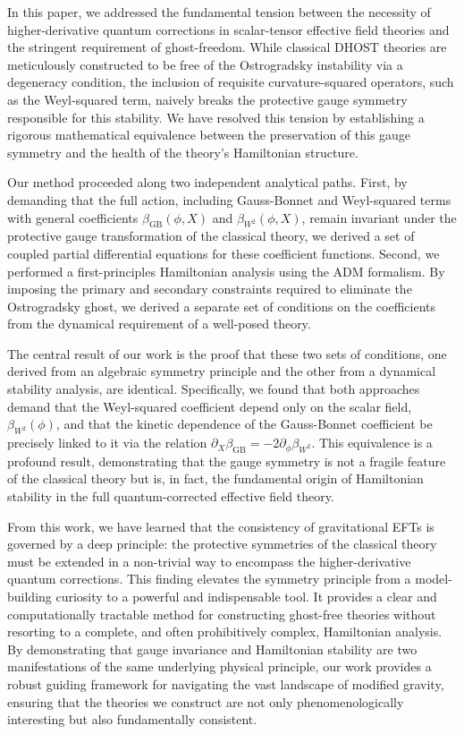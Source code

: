 \documentclass[twocolumn]{aastex631}
\begin{document}
In this paper, we addressed the fundamental tension between the necessity of higher-derivative quantum corrections in scalar-tensor effective field theories and the stringent requirement of ghost-freedom. While classical DHOST theories are meticulously constructed to be free of the Ostrogradsky instability via a degeneracy condition, the inclusion of requisite curvature-squared operators, such as the Weyl-squared term, naively breaks the protective gauge symmetry responsible for this stability. We have resolved this tension by establishing a rigorous mathematical equivalence between the preservation of this gauge symmetry and the health of the theory's Hamiltonian structure.

Our method proceeded along two independent analytical paths. First, by demanding that the full action, including Gauss-Bonnet and Weyl-squared terms with general coefficients $\beta_{\text{GB}}(\phi, X)$ and $\beta_{W^2}(\phi, X)$, remain invariant under the protective gauge transformation of the classical theory, we derived a set of coupled partial differential equations for these coefficient functions. Second, we performed a first-principles Hamiltonian analysis using the ADM formalism. By imposing the primary and secondary constraints required to eliminate the Ostrogradsky ghost, we derived a separate set of conditions on the coefficients from the dynamical requirement of a well-posed theory.

The central result of our work is the proof that these two sets of conditions, one derived from an algebraic symmetry principle and the other from a dynamical stability analysis, are identical. Specifically, we found that both approaches demand that the Weyl-squared coefficient depend only on the scalar field, $\beta_{W^2}(\phi)$, and that the kinetic dependence of the Gauss-Bonnet coefficient be precisely linked to it via the relation $\partial_X \beta_{\text{GB}} = -2 \partial_\phi \beta_{W^2}$. This equivalence is a profound result, demonstrating that the gauge symmetry is not a fragile feature of the classical theory but is, in fact, the fundamental origin of Hamiltonian stability in the full quantum-corrected effective field theory.

From this work, we have learned that the consistency of gravitational EFTs is governed by a deep principle: the protective symmetries of the classical theory must be extended in a non-trivial way to encompass the higher-derivative quantum corrections. This finding elevates the symmetry principle from a model-building curiosity to a powerful and indispensable tool. It provides a clear and computationally tractable method for constructing ghost-free theories without resorting to a complete, and often prohibitively complex, Hamiltonian analysis. By demonstrating that gauge invariance and Hamiltonian stability are two manifestations of the same underlying physical principle, our work provides a robust guiding framework for navigating the vast landscape of modified gravity, ensuring that the theories we construct are not only phenomenologically interesting but also fundamentally consistent.
\end{document}
